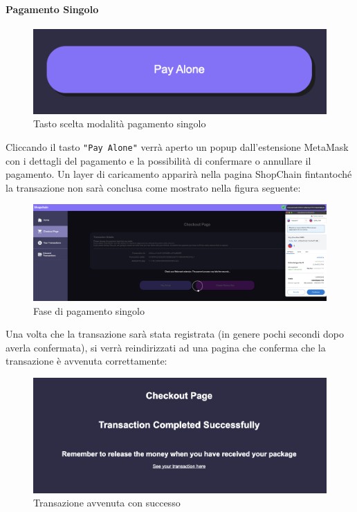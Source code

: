             \paragraph{Pagamento Singolo}
            \begin{figure}[H]
                \centering
                \includegraphics[scale=0.3]{immagini/Checkout/PayAlone.png}
                \caption{Tasto scelta modalità pagamento singolo}
            \end{figure}
            Cliccando il tasto \texttt{"Pay Alone"} verrà aperto un popup dall'estensione MetaMask con i dettagli del pagamento e la possibilità di confermare o annullare il pagamento. Un layer di caricamento apparirà nella pagina ShopChain fintantoché la transazione non sarà conclusa come mostrato nella figura seguente:
            \begin{figure}[H]
                \centering
                \includegraphics[scale=0.2]{immagini/Checkout/SinglePaymentLayer.png}
                \caption{Fase di pagamento singolo}
            \end{figure}
            Una volta che la transazione sarà stata registrata (in genere pochi secondi dopo averla confermata), si verrà reindirizzati ad una pagina che conferma che la transazione è avvenuta correttamente:
            \begin{figure}[H]
                \centering
                \includegraphics[scale=0.3]{immagini/Checkout/PayAloneTransactionSuccess.png}
                \caption{Transazione avvenuta con successo}
            \end{figure}
